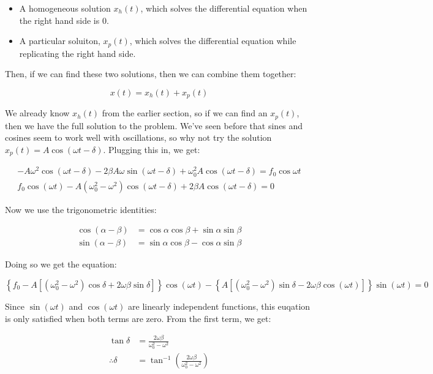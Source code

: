 \begin{itemize}
    \item A homogeneous solution $x_h(t)$, which solves the differential equation when the right hand side is 0. 
    \item A particular soluiton, $x_p(t)$, which solves the differential equation while replicating the right hand side. 
\end{itemize}

Then, if we can find these two solutions, then we can combine them together: 

\[ x(t) = x_h(t) + x_p(t)\] 

We already know $x_h(t)$ from the earlier section, so if we can find an $x_p(t)$, then we have the full solution to the problem. We've seen before that sines and cosines seem to work well with oscillations, so why not try the solution $x_p(t) = A\cos(\omega t - \delta)$. Plugging this in, we get: 

\begin{align*}
    -A\omega^2 \cos(\omega t - \delta) - 2\beta A \omega \sin (\omega t - \delta) + \omega_0^2 A \cos(\omega t - \delta) = f_0 \cos \omega t\\
    f_0 \cos (\omega t) - A(\omega_0^2 - \omega^2)\cos(\omega t - \delta) + 2\beta A \cos(\omega t - \delta) = 0
\end{align*}

Now we use the trigonometric identities:

\begin{align*}
    \cos(\alpha - \beta) &= \cos \alpha \cos \beta + \sin \alpha \sin \beta\\
    \sin(\alpha - \beta) &= \sin \alpha \cos \beta - \cos \alpha \sin \beta
\end{align*}
    
Doing so we get the equation:


\[ \left \{ f_0 - A\left[ (\omega_0^2 - \omega^2)\cos \delta + 2\omega \beta \sin \delta \right]\right \} \cos (\omega t) -  \left \{A\left[ (\omega_0^2 - \omega^2)\sin \delta - 2\omega \beta \cos(\omega t)\right] \right \} \sin(\omega t) = 0\] 

Since $\sin(\omega t)$ and $\cos(\omega t)$ are linearly independent functions, this euqation is only satisfied when both terms are zero. From the first term, we get:

\begin{align*}
    \tan \delta &= \frac{2\omega \beta}{\omega_0^2 - \omega^2} \\
    \therefore \delta &= \tan^{-1}\left(\frac{2\omega \beta}{\omega_0^2 - \omega^2}\right)
\end{align*}

